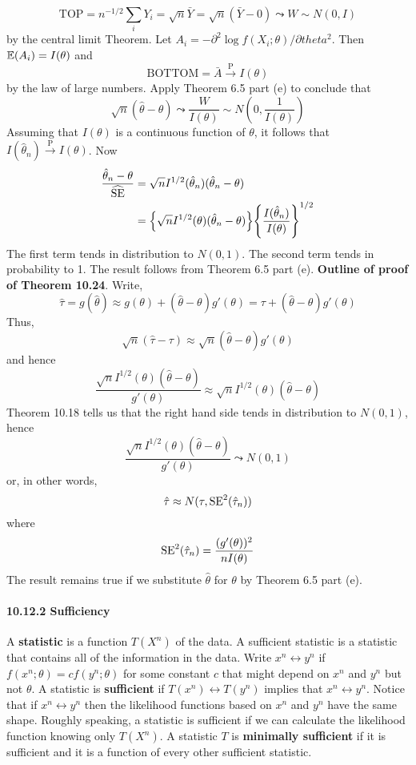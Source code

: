 \[
\text{TOP} = n^{-1/2} \sum_{i} Y_{i} = \sqrt{n} \bar{Y} = \sqrt{n} (\bar{Y} - 0) \leadsto W \sim N(0, I)
\]
by the central limit Theorem. Let
\(A_{i} = -\partial^{2} \log f(X_{i}; \theta) / \partial theta^{2}\). Then
\(\operatorname{\mathbb{E}}(A_{i}) = I(\theta)\) and
\[
\text{BOTTOM} = \bar{A} \xrightarrow{\textrm{P}} I(\theta)
\]
by the law of large numbers. Apply Theorem 6.5 part (e) to conclude that
\[
\sqrt{n}(\hat{\theta} - \theta) \leadsto \frac{W}{I(\theta)} \sim N \left(0, \frac{1}{I(\theta)} \right)
\]
Assuming that \(I(\theta)\) is a continuous function of \(\theta\), it
follows that \(I(\hat{\theta}_{n}) \xrightarrow{\textrm{P}} I(\theta)\). Now
\begin{align*}
\frac{\hat{\theta}_{n} - \theta}{\widehat{\SE}}&= \sqrt{n} I^{1/2}(\hat{\theta}_{n})(\hat{\theta}_{n} - \theta) \\
&= \left\{ \sqrt{n} I^{1/2}(\theta)(\hat{\theta}_{n} - \theta)\right\} \left\{ \frac{I(\hat{\theta}_{n})}{I(\theta)} \right\}^{1/2}
\end{align*}
The first term tends in distribution to \(N(0, 1)\). The second term
tends in probability to 1. The result follows from Theorem 6.5 part (e).
\textbf{Outline of proof of Theorem 10.24}. Write,
\[
\hat{\tau} = g(\hat{\theta}) \approx g(\theta) + (\hat{\theta} - \theta)g'(\theta) = \tau + (\hat{\theta} - \theta)g'(\theta)
\]
Thus,
\[
\sqrt{n}(\hat{\tau} - \tau) \approx \sqrt{n}(\hat{\theta} - \theta)g'(\theta)
\]
and hence
\[
\frac{\sqrt{n}I^{1/2}(\theta)(\hat{\theta} - \theta)}{g'(\theta)} \approx \sqrt{n}I^{1/2}(\theta)(\hat{\theta} - \theta)
\]
Theorem 10.18 tells us that the right hand side tends in distribution to
\(N(0, 1)\), hence
\[
\frac{\sqrt{n}I^{1/2}(\theta)(\hat{\theta} - \theta)}{g'(\theta)} \leadsto N(0, 1)
\]
or, in other words,
\[
\hat{\tau} \approx N(\tau, \operatorname{\mathrm{SE}} ^{2}(\hat{\tau}_{n}))
\]
where
\[
\operatorname{\mathrm{SE}} ^{2}(\hat{\tau}_{n}) = \frac{(g'(\theta))^{2}}{nI(\theta)}
\]
The result remains true if we substitute \(\hat{\theta}\) for \(\theta\)
by Theorem 6.5 part (e).
\paragraph{10.12.2 Sufficiency}\label{sufficiency}
A \textbf{statistic} is a function \(T(X^{n})\) of the data. A sufficient
statistic is a statistic that contains all of the information in the
data.
Write \(x^{n} \leftrightarrow y^{n}\) if
\(f(x^{n}; \theta) = c f(y^{n}; \theta)\) for some constant \(c\) that might
depend on \(x^{n}\) and \(y^{n}\) but not \(\theta\). A statistic is
\textbf{sufficient} if \(T(x^{n}) \leftrightarrow T(y^{n})\) implies that
\(x^{n} \leftrightarrow y^{n}\).
Notice that if \(x^{n} \leftrightarrow y^{n}\) then the likelihood functions
based on \(x^{n}\) and \(y^{n}\) have the same shape. Roughly speaking, a
statistic is sufficient if we can calculate the likelihood function
knowing only \(T(X^{n})\).
A statistic \(T\) is \textbf{minimally sufficient} if it is sufficient
and it is a function of every other sufficient statistic.

